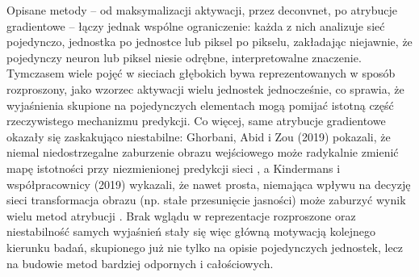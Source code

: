 Opisane metody -- od maksymalizacji aktywacji, przez deconvnet, po atrybucje gradientowe -- łączy jednak wspólne ograniczenie: każda z nich analizuje sieć pojedynczo, jednostka po jednostce lub piksel po pikselu, zakładając niejawnie, że pojedynczy neuron lub piksel niesie odrębne, interpretowalne znaczenie. Tymczasem wiele pojęć w sieciach głębokich bywa reprezentowanych w sposób rozproszony, jako wzorzec aktywacji wielu jednostek jednocześnie, co sprawia, że wyjaśnienia skupione na pojedynczych elementach mogą pomijać istotną część rzeczywistego mechanizmu predykcji. Co więcej, same atrybucje gradientowe okazały się zaskakująco niestabilne: Ghorbani, Abid i Zou (2019) pokazali, że niemal niedostrzegalne zaburzenie obrazu wejściowego może radykalnie zmienić mapę istotności przy niezmienionej predykcji sieci \cite{ghorbani_interpretation_of_neural_networks_is_fragile}, a Kindermans i współpracownicy (2019) wykazali, że nawet prosta, niemająca wpływu na decyzję sieci transformacja obrazu (np. stałe przesunięcie jasności) może zaburzyć wynik wielu metod atrybucji \cite{kindermans_the_unreliability_of_saliency_methods}. Brak wglądu w reprezentacje rozproszone oraz niestabilność samych wyjaśnień stały się więc główną motywacją kolejnego kierunku badań, skupionego już nie tylko na opisie pojedynczych jednostek, lecz na budowie metod bardziej odpornych i całościowych.


